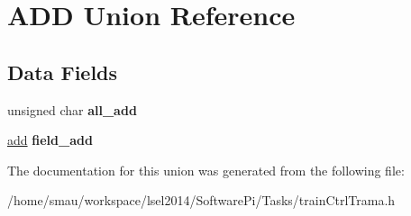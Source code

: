 \hypertarget{unionADD}{\section{A\-D\-D Union Reference}
\label{unionADD}
}
\subsection*{Data Fields}
\begin{DoxyCompactItemize}
\item 
\hypertarget{unionADD_a1ea21c54e17fcd39e126106fead9cf09}{unsigned char {\bfseries all\-\_\-add}}\label{unionADD_a1ea21c54e17fcd39e126106fead9cf09}

\item 
\hypertarget{unionADD_ae54d7ac6a5ce9f27a0d2eff55336e25b}{\hyperlink{structadd}{add} {\bfseries field\-\_\-add}}\label{unionADD_ae54d7ac6a5ce9f27a0d2eff55336e25b}

\end{DoxyCompactItemize}


The documentation for this union was generated from the following file\-:\begin{DoxyCompactItemize}
\item 
/home/smau/workspace/lsel2014/\-Software\-Pi/\-Tasks/train\-Ctrl\-Trama.\-h\end{DoxyCompactItemize}
